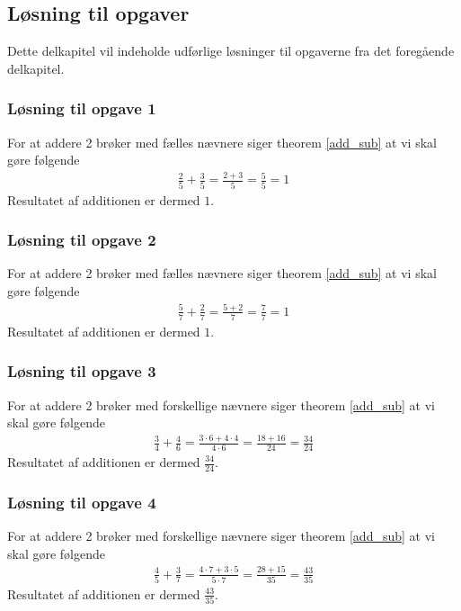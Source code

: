 \subsection{Løsning til opgaver}
Dette delkapitel vil indeholde udførlige løsninger til opgaverne fra det foregående delkapitel. 

\subsubsection*{Løsning til opgave 1}
For at addere 2 brøker med fælles nævnere siger theorem \ref{add_sub} at vi skal gøre følgende
\begin{align*}
\frac{2}{5} + \frac{3}{5} = \frac{2 + 3}{5} = \frac{5}{5} = 1
\end{align*}
Resultatet af additionen er dermed $1$. 

\subsubsection*{Løsning til opgave 2}
For at addere 2 brøker med fælles nævnere siger theorem \ref{add_sub} at vi skal gøre følgende
\begin{align*}
\frac{5}{7} + \frac{2}{7} = \frac{5 + 2}{7} = \frac{7}{7} = 1
\end{align*}
Resultatet af additionen er dermed $1$.

\subsubsection*{Løsning til opgave 3}
For at addere 2 brøker med forskellige nævnere siger theorem \ref{add_sub} at vi skal gøre følgende 
\begin{align*}
\frac{3}{4} + \frac{4}{6} = \frac{3\cdot 6 + 4\cdot 4}{4\cdot 6} = \frac{18 + 16}{24} = \frac{34}{24}
\end{align*}
Resultatet af additionen er dermed $\frac{34}{24}$.

\subsubsection*{Løsning til opgave 4}
For at addere 2 brøker med forskellige nævnere siger theorem \ref{add_sub} at vi skal gøre følgende
\begin{align*}
\frac{4}{5} + \frac{3}{7} = \frac{4\cdot 7 + 3 \cdot 5}{5\cdot 7} = \frac{28 + 15}{35} = \frac{43}{35}
\end{align*}
Resultatet af additionen er dermed $\frac{43}{35}$.

